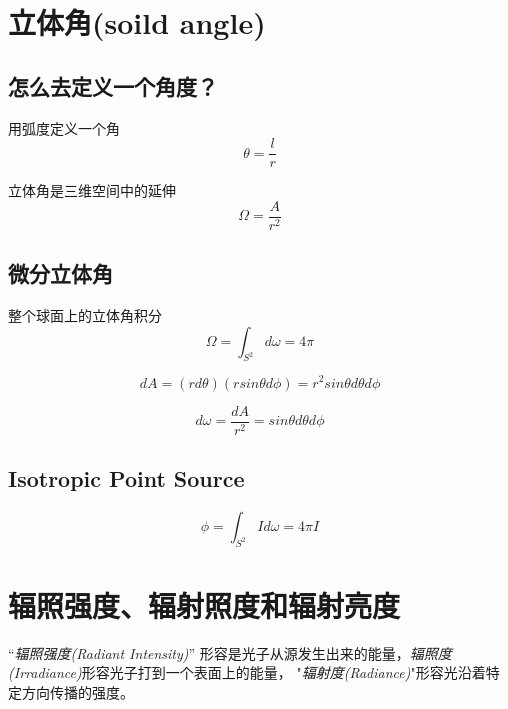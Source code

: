 \section{立体角(soild angle)}

\subsection*{怎么去定义一个角度？}

用弧度定义一个角
\begin{equation}
    \theta=\frac{l}{r}
\end{equation}

立体角是三维空间中的延伸
\begin{equation}
    \Omega=\frac{A}{r^2}
\end{equation}

\subsection*{微分立体角}

整个球面上的立体角积分
\begin{equation}
    \Omega=\int_{S^2}d\omega=4\pi
\end{equation}

\begin{equation}
    dA=(rd\theta)(rsin\theta d\phi)=r^2sin\theta d\theta d\phi
\end{equation}

\begin{equation}
    d\omega=\frac{dA}{r^2}=sin\theta d\theta d\phi
\end{equation}

\subsection*{Isotropic Point Source}

\begin{equation}
    \phi=\int_{S^2}Id\omega=4\pi I
\end{equation}


\section{辐照强度、辐射照度和辐射亮度}

“\textsl{辐照强度(Radiant Intensity)}” 形容是光子从源发生出来的能量，\textsl{辐照度(Irradiance)}形容光子打到一个表面上的能量，
"\textsl{辐射度(Radiance)}"形容光沿着特定方向传播的强度。

